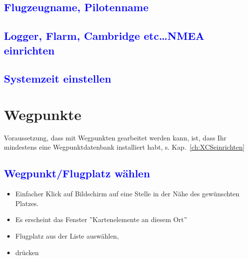 \subsection*{\textcolor{blue}{Flugzeugname, Pilotenname}}
\bc\sk\blink{}\blink{}\ec
\subsection*{\textcolor{blue}{Logger, Flarm, Cambridge etc\dots NMEA einrichten}}
\bc\sk\blink{}\blink{}\ec
\subsection*{\textcolor{blue}{Systemzeit einstellen}}
\bc\sk\blink{}\blink{}\ec
\newpage\section{Wegpunkte}
Voraussetzung, dass mit Wegpunkten gearbeitet werden kann, ist, dass Ihr mindestens eine Wegpunktdatenbank installiert habt,
s. Kap.~\ref{ch:XCSeinrichten}
\subsection*{\textcolor{blue}{Wegpunkt/Flugplatz wählen}}
\begin{itemize}
\item Einfacher Klick auf Bildschirm auf eine Stelle in der Nähe des gewünschten Platzes.
\item Es erscheint das Fenster ''Kartenelemente an diesem Ort''
\item Flugplatz aus der Liste auswählen,
\item {} drücken
\end{itemize}
